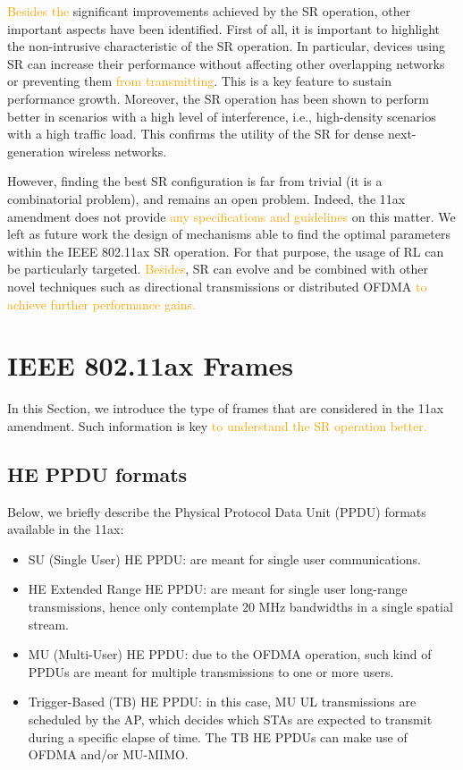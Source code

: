 \documentclass{ieeeaccess}
\begin{document}
\textcolor{orange}{Besides the} significant improvements achieved by the SR operation, other important aspects have been identified. First of all, it is important to highlight the non-intrusive characteristic of the SR operation. In particular, devices using SR can increase their performance without affecting other overlapping networks or preventing them \textcolor{orange}{from transmitting}. This is a key feature to sustain performance growth. Moreover, the SR operation has been shown to perform better in scenarios with a high level of interference, i.e., high-density scenarios with a high traffic load. This confirms the utility of the SR for dense next-generation wireless networks.

However, finding the best SR configuration is far from trivial (it is a combinatorial problem), and remains an open problem. Indeed, the 11ax amendment does not provide \textcolor{orange}{any specifications and guidelines} on this matter. We left as future work the design of mechanisms able to find the optimal parameters within the IEEE 802.11ax SR operation. For that purpose, the usage of RL can be particularly targeted. \textcolor{orange}{Besides}, SR can evolve and be combined with other novel techniques such as directional transmissions or distributed OFDMA \textcolor{orange}{to achieve further performance gains.}

\appendices
\section{IEEE 802.11ax Frames}
\label{section:frames}
In this Section, we introduce the type of frames that are considered in the 11ax amendment. Such information is key \textcolor{orange}{to understand the SR operation better.}

\subsection{HE PPDU formats}
Below, we briefly describe the Physical Protocol Data Unit (PPDU) formats available in the 11ax:
\begin{itemize}
	\item SU (Single User) HE PPDU: are meant for single user communications.
	\item  HE Extended Range HE PPDU: are meant for single user long-range transmissions, hence only contemplate 20 MHz bandwidths in a single spatial stream.
	\item  MU (Multi-User) HE PPDU: due to the OFDMA operation, such kind of PPDUs are meant for multiple transmissions to one or more users.
	\item Trigger-Based (TB) HE PPDU: in this case, MU UL transmissions are scheduled by the AP, which decides which STAs are expected to transmit during a specific elapse of time. The TB HE PPDUs can make use of OFDMA and/or MU-MIMO.
\end{itemize}
\end{document}

